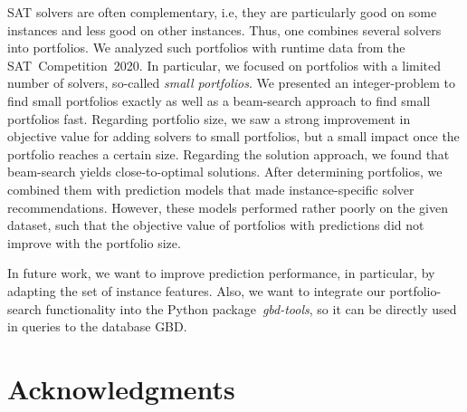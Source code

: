 \documentclass[conference]{IEEEtran}
\begin{document}
SAT solvers are often complementary, i.e, they are particularly good on some instances and less good on other instances.
Thus, one combines several solvers into portfolios.
We analyzed such portfolios with runtime data from the SAT~Competition~2020.
In particular, we focused on portfolios with a limited number of solvers, so-called \emph{small portfolios}.
We presented an integer-problem to find small portfolios exactly as well as a beam-search approach to find small portfolios fast.
Regarding portfolio size, we saw a strong improvement in objective value for adding solvers to small portfolios, but a small impact once the portfolio reaches a certain size.
Regarding the solution approach, we found that beam-search yields close-to-optimal solutions.
After determining portfolios, we combined them with prediction models that made instance-specific solver recommendations.
However, these models performed rather poorly on the given dataset, such that the objective value of portfolios with predictions did not improve with the portfolio size.

In future work, we want to improve prediction performance, in particular, by adapting the set of instance features.
Also, we want to integrate our portfolio-search functionality into the Python package~\emph{gbd-tools}, so it can be directly used in queries to the database GBD.

\section*{Acknowledgments}


\balance %



\end{document}
